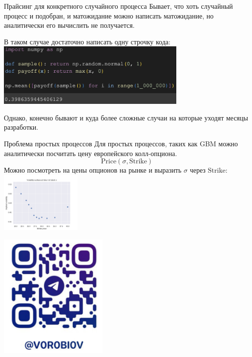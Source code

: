 \documentclass{beamer}
\begin{document}
    \begin{frame}{Прайсинг для конкретного случайного процесса}
        Бывает, что хоть случайный процесс и подобран, и матожидание можно написать матожидание, но аналитически его вычислить не получается.

        В таком случае достаточно написать одну строчку кода:
        \includegraphics[width=0.7\textwidth]{code.png}

        Однако, конечно бывают и куда более сложные случаи на которые уходят месяцы разработки.

    \end{frame}

    \begin{frame}{Проблема простых процессов}
        Для простых процессов, таких как GBM можно аналитически посчитать цену европейского колл-опциона.
        \[
            \mathrm{Price}\left(\sigma, \mathrm{Strike}\right)
        \]
        Можно посмотреть на цены опционов на рынке и выразить $\sigma$ через $\mathrm{Strike}$:
        \includegraphics[width=0.3\textwidth]{implied.png}
    \end{frame}

    \begin{frame}
        \center
        \includegraphics[width=0.4\textwidth]{me.png}
    \end{frame}
\end{document}
